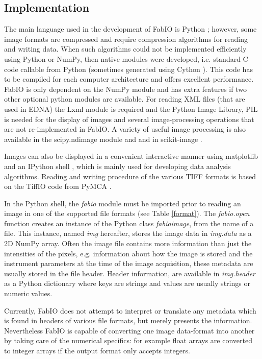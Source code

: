 \documentclass[preprint ]{iucr}
\begin{document}
\subsection{Implementation}
The main language used in the development of FabIO is Python \cite{python};
however, some image formats are compressed and require
compression algorithms for reading and writing data. 
When such algorithms could not be implemented efficiently using Python or NumPy,
then native modules were developed, i.e. standard C code callable from Python 
(sometimes generated using Cython \cite{cython}).
This code has to be compiled for each computer architecture and offers 
excellent performance.
FabIO is only dependent on the NumPy module and has extra features if two other
optional python modules are available. 
For reading XML files (that are used in EDNA) the Lxml \cite{lxml} module is
required and the Python Image Library, PIL \cite{pil} is needed for the display of 
images and several image-processing operations that are not re-implemented 
in FabIO.
A variety of useful image processing is also available in the scipy.ndimage 
module \cite{scipy} and and in scikit-image \cite{skimage}.

Images can also be displayed in a convenient interactive manner using
matplotlib \cite{matplotlib} and an IPython shell \cite{ipython}, which is
mainly used for developing data analysis algorithms.
Reading and writing procedure of the various TIFF \cite{tiff} formats is based
on the TiffIO code from PyMCA \cite{pymca}.

In the Python shell, the {\em fabio} module must be imported prior to reading an
image in one of the supported file formats (see Table \ref{format}).
The {\em fabio.open} function creates an instance of the Python class {\em fabioimage},
from the name of a file. This instance, named {\em img} hereafter, stores the
image data in {\em img.data} as a 2D NumPy array. Often the image file contains
more information than just the intensities of the pixels, e.g.
information about how the image is stored and the instrument parameters at the
time of the image acquisition, these metadata are usually stored in
the file header.
Header information, are available in {\em img.header} as a Python
dictionary where keys are strings and values are usually strings or
numeric values.

Currently, FabIO does not attempt to interpret or translate any metadata which
is found in headers of various file formats, but merely presents the
information. Nevertheless FabIO is capable of converting one
image data-format into another by taking care of the numerical specifics: 
for example float arrays are converted to integer arrays if the output format only
accepts integers.
\end{document}
